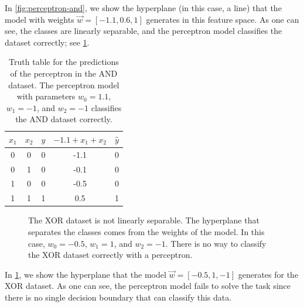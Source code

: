 In \cref{fig:perceptron-and}, we show the hyperplane (in this case, a line) that the model
with weights $\vec{w} = [-1.1, 0.6, 1]$ generates in this feature space.
As one can see, the classes are linearly separable, and the perceptron model classifies
the dataset correctly; see \cref{tab:and-perceptron}.

\begin{table}
  \centering
  \begin{tabular}{ccc|cc}
    \toprule
    $x_1$ & $x_2$ & $y$ & $-1.1 + x_1 + x_2$ & $\hat{y}$ \\
    \midrule
    0 & 0 & 0 & -1.1 & 0 \\
    0 & 1 & 0 & -0.1 & 0 \\
    1 & 0 & 0 & -0.5 & 0 \\
    1 & 1 & 1 & 0.5 & 1 \\
    \bottomrule
  \end{tabular}
  \caption{
  Truth table for the predictions of the perceptron in the AND dataset.
  The perceptron model with parameters $w_0 = 1.1$, $w_1 = -1$, and $w_2 = -1$
  classifies the AND dataset correctly.
  }
  \label{tab:and-perceptron}
\end{table}

\begin{figure}
  \centering
  \caption{
  The XOR dataset is not linearly separable.
  The hyperplane that separates the classes comes from the weights of the model.
  In this case, $w_0 = -0.5$, $w_1 = 1$, and $w_2 = -1$.
  There is no way to classify the XOR dataset correctly with a perceptron.
  }
  \label{fig:perceptron-xor}
\end{figure}

In \cref{fig:perceptron-xor}, we show the hyperplane that the model $\vec{w} = [-0.5, 1, -1]$
generates for the XOR dataset.  As one can see, the perceptron model fails to solve the
task since there is no single decision boundary that can classify this data.

